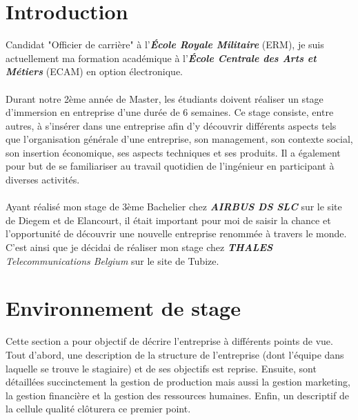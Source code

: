 \documentclass[10pt, oneside, a4paper]{article}
\begin{document}
\tableofcontents
\newpage


\section*{Introduction}

Candidat "Officier de carrière" à l’\textbf{\textit{École Royale Militaire}} (ERM), je suis actuellement ma formation académique à l’\textbf{\textit{École Centrale des Arts et Métiers}} (ECAM) en option électronique. \\ \\
Durant notre 2ème année de Master, les étudiants doivent réaliser un stage d’immersion en entreprise d’une durée de 6 semaines. Ce stage consiste, entre autres, à s’insérer dans une entreprise afin d’y découvrir différents aspects tels que l’organisation générale d’une entreprise, son management, son contexte social, son insertion économique, ses aspects techniques et ses produits. Il a également pour but de se familiariser au travail quotidien de l’ingénieur en participant à diverses activités. \\ \\
Ayant réalisé mon stage de 3ème Bachelier chez \textbf{\textit{AIRBUS DS SLC}} sur le site de Diegem et de Elancourt, il était important pour moi de saisir la chance et l’opportunité de découvrir une nouvelle entreprise renommée à travers le monde. C'est ainsi que je décidai de réaliser mon stage chez \textit{\textbf{THALES} Telecommunications Belgium} sur le site de Tubize. 

\newpage

\section{Environnement de stage}
Cette section a pour objectif de décrire l'entreprise à différents points de vue. Tout d'abord, une description de la structure de l'entreprise (dont l'équipe dans laquelle se trouve le stagiaire) et de ses objectifs est reprise. Ensuite, sont détaillées succinctement la gestion de production mais aussi la gestion marketing, la gestion financière et la gestion des ressources humaines. Enfin, un descriptif de la cellule qualité clôturera ce premier point.
\end{document}
